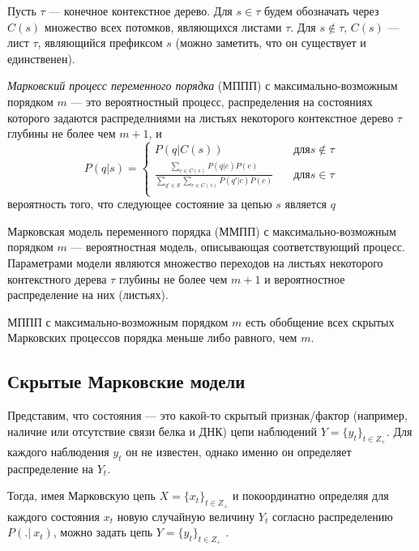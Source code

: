 \documentclass{matmex-diploma-custom}
\begin{document}
Пусть $\tau$ --- конечное контекстное дерево.
Для $s \in \tau$ будем обозначать через $ C(s) $ множество всех потомков, являющихся листами $\tau$. 
Для $s \notin \tau$, $C(s)$ --- лист $\tau$, являющийся префиксом  $s$ (можно заметить, что он существует и единственен).
\begin{definition}
\textit{Марковский процесс переменного порядка} (МППП) с максимально-возможным порядком $m$ --- это вероятностный процесс, распределения на состояниях которого задаются распределниями на листьях некоторого контекстное дерево $\tau$ глубины не более чем $m+1$, и 
\[ P(q |s) =
  \begin{cases}
    P(q|C(s))       & \quad \text{для} s \notin \tau\\
    \frac{\sum_{c \in C(s)} {P(q|c)P(c)}}{\sum_{q' \in S}\sum_{c \in C(s)} {P(q'|c)P(c)}} & \quad \text{для} s \in \tau\\
  \end{cases}
\]
вероятность того, что следующее состояние за цепью $s$ является $q$
\label{def:c_trie}
\end{definition}

\begin{definition}
Марковская модель переменного порядка (ММПП) с максимально-возможным порядком $m$ --- вероятностная модель, описывающая соответствующий процесс.
Параметрами модели являются множество переходов на листьях некоторого контекстного дерева $\tau$ глубины не более чем $m+1$ и вероятностное распределение на них (листьях).
\end{definition}

\begin{remark}
МППП с максимально-возможным порядком $m$ есть обобщение всех скрытых Марковских процессов порядка меньше либо равного, чем $ m $.
\end{remark}

\subsection{Скрытые Марковские модели}
Представим, что состояния --- это какой-то скрытый признак/фактор (например, наличие или отсутствие связи белка и ДНК) цепи наблюдений $Y = \{y_{t}\}_{t \in Z_{+}}$. Для каждого наблюдения $y_{t}$ он не известен, однако именно он определяет распределение на $Y_{t}$.

Тогда, имея Марковскую цепь $X = \{x_{t}\}_{t \in Z_{+}}$ и покоординатно определяя для каждого состояния $x_{t}$ новую случайную величину $Y_{t}$ согласно распределению $P(.|~x_{t})$, можно задать цепь
$Y = \{y_{t}\}_{t \in Z_{+}}$ .
\end{document}
